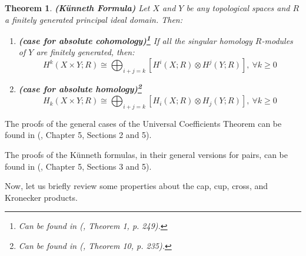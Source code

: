 \documentclass[12pt,oneside]{book}
\newtheorem{teo}    {Theorem}[chapter]
\newcommand{\ds}{\displaystyle}
\newcommand{\tensor}{\otimes}
\begin{document}
    \begin{teo}{\bf (Künneth Formula)}
        Let $X$ and $Y$ be any topological spaces and $R$ a finitely generated principal ideal 
        domain. Then:
        \begin{enumerate}
            \item \textbf{(case for absolute cohomology)\footnote{Can be found in (\cite{spanier}, 
            Theorem 1, p. 249).}} If all the singular homology $R$-modules of $Y$ are finitely 
            generated, then:
            $$ H^{k}(X\times Y;R)\cong \ds\bigoplus_{i+j=k}\left[ H^{i}(X;R)\tensor H^{j}(Y;R)\right], \ 
            \forall k\geq 0 $$
            \item \textbf{(case for absolute homology)\footnote{Can be found in (\cite{spanier}, 
            Theorem 10, p. 235).}}
            $$ H_{k}(X\times Y;R)\cong \ds\bigoplus_{i+j=k}\left[ H_{i}(X;R)\tensor H_{j}(Y;R)\right], \ 
            \forall k\geq 0 $$
        \end{enumerate}
    \end{teo}
    
    The proofs of the general cases of the Universal Coefficients Theorem can be found in (\cite{spanier}, 
    Chapter 5, Sections 2 and 5).
    
    The proofs of the Künneth formulas, in their general versions for pairs, can be found in 
    (\cite{spanier}, Chapter 5, Sections 3 and 5).
    
    Now, let us briefly review some properties about the cap, cup, 
    cross, and Kronecker products.
\end{document}
